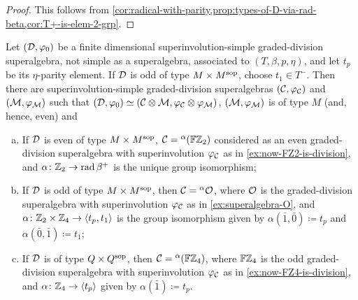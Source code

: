 \begin{proof}
    This follows from \cref{cor:radical-with-parity,prop:types-of-D-via-rad-beta,cor:T+-is-elem-2-grp}. 
\end{proof}


\begin{thm}\label{thm:tensor-prd-decomposition}
	Let $(\mathcal{D}, \varphi_0)$ be a finite dimensional superinvolution-simple graded-division superalgebra, not simple as a superalgebra, associated to $(T, \beta, p, \eta)$, and let $t_p$ be its $\eta$-parity element. 
	If $\mathcal{D}$ is odd of type $M\times M^{\mathrm{sop}}$, choose $t_1 \in T^-$.  
	Then there are superinvolution-simple graded-division superalgebras $(\mathcal C,\varphi_{\mathcal C})$ and $(\mathcal M,\varphi_{\mathcal M})$ such that $(\mathcal{D}, \varphi_0) \simeq (\mathcal C \otimes \mathcal M, \varphi_{\mathcal C} \otimes \varphi_{\mathcal M})$, $(\mathcal M,\varphi_{\mathcal M})$ is of type $M$ (and, hence, even) and 
	\begin{enumerate}[(a)]
	    \item If $\mathcal{D}$ is even of type $M\times M^{\mathrm{sop}}$, $\mathcal C = {}^\alpha (\mathbb{F}\mathbb{Z}_2)$ considered as an even graded-division superalgebra with superinvolution $\varphi_{\mathcal C}$ as in \cref{ex:now-FZ2-is-division}, and $\alpha\colon \mathbb{Z}_2 \to \operatorname{rad} \beta^+$ is the unique group isomorphism; 
	    \item If $\mathcal{D}$ is odd of type $M\times M^{\mathrm{sop}}$, then $\mathcal C = {}^\alpha \mathcal O$, 
	    where $\mathcal O$ is the graded-division superalgebra with superinvolution $\varphi_{\mathcal C}$ as in \cref{ex:superalgebra-O}, and $\alpha\colon \mathbb{Z}_2 \times \mathbb{Z}_4 \to \langle t_p, t_1 \rangle$ is the group isomorphism given by $\alpha (\bar 1, \bar 0) \coloneqq t_p$ and $\alpha (\bar 0, \bar 1) \coloneqq t_1$; 
	    \item If $\mathcal{D}$ is of type $Q\times Q^{\mathrm{sop}}$, then $\mathcal C = {}^\alpha (\mathbb{F}\mathbb{Z}_4)$, 
	    where $\mathbb{F}\mathbb{Z}_4$ is the odd graded-division superalgebra  with superinvolution $\varphi_{\mathcal C}$ as in \cref{ex:now-FZ4-is-division}, and $\alpha\colon \mathbb{Z}_4 \to \langle t_p \rangle$ given by $\alpha (\bar 1) \coloneqq t_p$.
	\end{enumerate}
\end{thm}


